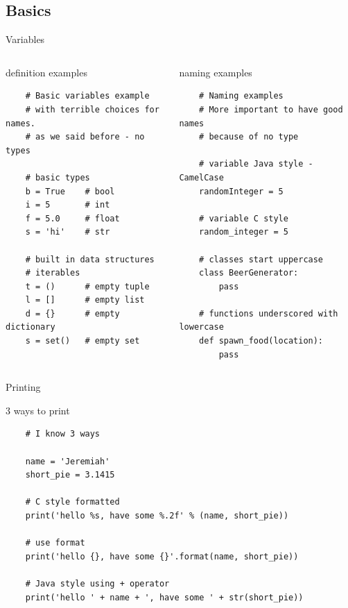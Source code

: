 \documentclass{bredelebeamer}
\begin{document}
\subsection{Basics}
\begin{frame}[fragile]{Variables}
  \begin{columns}
    \begin{column}{0.5\textwidth}
      \begin{exampleblock}{definition examples}
        \begin{lstlisting}
    # Basic variables example 
    # with terrible choices for names.
    # as we said before - no types

    # basic types
    b = True    # bool
    i = 5       # int
    f = 5.0     # float
    s = 'hi'    # str

    # built in data structures
    # iterables
    t = ()      # empty tuple
    l = []      # empty list
    d = {}      # empty dictionary
    s = set()   # empty set
        \end{lstlisting}
      \end{exampleblock}
    \end{column}

    \begin{column}{0.5\textwidth}
      \begin{exampleblock}{naming examples}
        \begin{lstlisting}
    # Naming examples 
    # More important to have good names
    # because of no type

    # variable Java style - CamelCase
    randomInteger = 5

    # variable C style
    random_integer = 5

    # classes start uppercase
    class BeerGenerator:
        pass

    # functions underscored with lowercase
    def spawn_food(location):
        pass
        \end{lstlisting}
      \end{exampleblock}
    \end{column}
  \end{columns}
\end{frame}

\begin{frame}[fragile]{Printing}
  \begin{exampleblock}{3 ways to print}
    \begin{lstlisting}
    # I know 3 ways
    
    name = 'Jeremiah'
    short_pie = 3.1415

    # C style formatted
    print('hello %s, have some %.2f' % (name, short_pie))

    # use format
    print('hello {}, have some {}'.format(name, short_pie))

    # Java style using + operator
    print('hello ' + name + ', have some ' + str(short_pie))
    \end{lstlisting}
  \end{exampleblock}
\end{frame}
\end{document}
